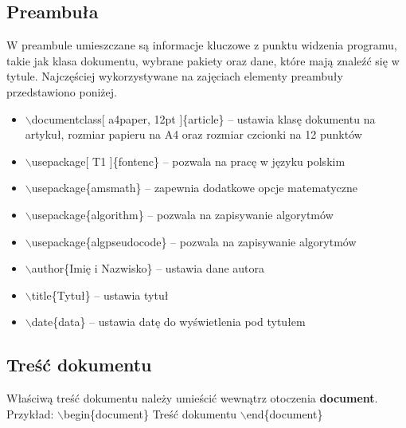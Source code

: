 \documentclass[a4paper, 12pt]{article}
\begin{document}
\subsection{Preambuła}
W preambule umieszczane są informacje kluczowe z punktu widzenia programu, takie jak klasa dokumentu, wybrane pakiety oraz dane, które mają znaleźć się w tytule.\newline
Najczęściej wykorzystywane na zajęciach elementy preambuły przedstawiono poniżej.
\begin{itemize}
	\item $\backslash$documentclass[ a4paper, 12pt ]\{article\} -- ustawia klasę dokumentu na artykuł, rozmiar papieru na A4 oraz rozmiar czcionki na 12 punktów
	\item $\backslash$usepackage[ T1 ]\{fontenc\} -- pozwala na pracę w języku polskim
	\item $\backslash$usepackage\{amsmath\} -- zapewnia dodatkowe opcje matematyczne
	\item $\backslash$usepackage\{algorithm\} -- pozwala na zapisywanie algorytmów
	\item $\backslash$usepackage\{algpseudocode\} -- pozwala na zapisywanie algorytmów
	\item $\backslash$author\{Imię i Nazwisko\} -- ustawia dane autora
	\item $\backslash$title\{Tytuł\} -- ustawia tytuł
	\item $\backslash$date\{data\} -- ustawia datę do wyświetlenia pod tytułem
\end{itemize}

\subsection{Treść dokumentu}
Właściwą treść dokumentu należy umieścić wewnątrz otoczenia \textbf{document}. \newline
Przykład:\newline
$\backslash$begin\{document\}\newline
Treść dokumentu\newline
$\backslash$end\{document\}
\end{document}
